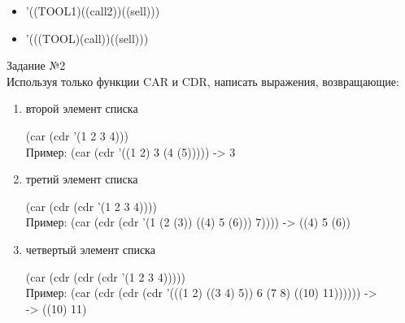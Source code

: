\begin{itemize}
\begin{figure}[ht!]
\end{figure}
\item '((TOOL1)((call2))((sell)))
\begin{figure}[ht!]
\end{figure}
\newpage
\item '(((TOOL)(call))((sell)))
\begin{figure}[ht!]
\end{figure}
\end{itemize}

{\LARGE Задание №2}\\

Используя только функции CAR и CDR, написать выражения, возвращающие:
\begin{enumerate}
\item второй элемент списка

(car (cdr '(1 2 3 4)))\\
Пример: (car (cdr '((1 2) 3 (4 (5))))) -> 3
\item третий элемент списка


(car (cdr (cdr '(1 2 3 4))))\\
Пример: (car (cdr (cdr '(1 (2 (3)) ((4) 5 (6))) 7)))) -> ((4) 5 (6))

\item четвертый элемент списка

(car (cdr (cdr (cdr '(1 2 3 4)))))\\
Пример: (car (cdr (cdr (cdr '(((1 2) ((3 4) 5)) 6 (7 8) ((10) 11)))))) -> \\ -> ((10) 11)

\end{enumerate}



